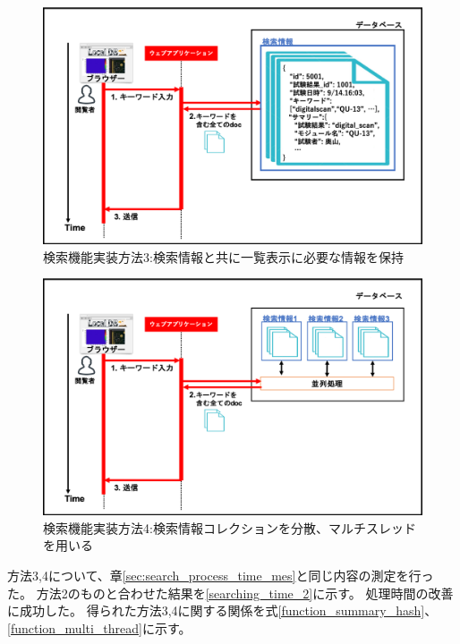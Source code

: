 \begin{figure}[bpt]
  \begin{center}
    \includegraphics[width=14cm]{search_summary_hash}
  \caption[検索機能実装方法3:検索情報と共に一覧表示に必要な情報を保持]{検索機能実装方法3:検索情報と共に一覧表示に必要な情報を保持}
  \label{search_summary_hash}
  \end{center}
\end{figure}

\begin{figure}[bpt]
  \begin{center}
    \includegraphics[width=14cm]{search_multi_thread}
  \caption[検索機能実装方法4:検索情報コレクションを分散、マルチスレッドを用いる]{検索機能実装方法4:検索情報コレクションを分散、マルチスレッドを用いる}
  \label{search_multi_thread}
  \end{center}
\end{figure}

方法3,4について、章\ref{sec:search_process_time_mes}と同じ内容の測定を行った。
方法2のものと合わせた結果を\ref{searching_time_2}に示す。
処理時間の改善に成功した。
得られた方法3,4に関する関係を式\ref{function_summary_hash}、\ref{function_multi_thread}に示す。

